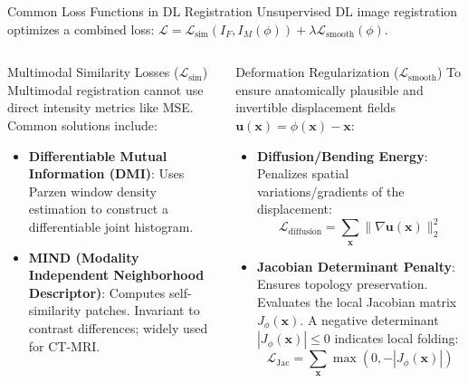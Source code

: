 \documentclass[aspectratio=169,10pt]{beamer}
\begin{document}
\begin{frame}{Common Loss Functions in DL Registration}
\small
Unsupervised DL image registration optimizes a combined loss: $\mathcal{L} = \mathcal{L}_{\text{sim}}(I_F, I_M(\phi)) + \lambda \mathcal{L}_{\text{smooth}}(\phi)$.

\begin{columns}[T,onlytextwidth]
\begin{block}{Multimodal Similarity Losses ($\mathcal{L}_{\text{sim}}$)}
Multimodal registration cannot use direct intensity metrics like MSE. Common solutions include:
\begin{itemize}
    \item \textbf{Differentiable Mutual Information (DMI)}: Uses Parzen window density estimation to construct a differentiable joint histogram.
    \item \textbf{MIND (Modality Independent Neighborhood Descriptor)}: Computes self-similarity patches. Invariant to contrast differences; widely used for CT-MRI.

\end{itemize}
\end{block}

\begin{block}{Deformation Regularization ($\mathcal{L}_{\text{smooth}}$)}
To ensure anatomically plausible and invertible displacement fields $\mathbf{u}(\mathbf{x}) = \phi(\mathbf{x}) - \mathbf{x}$:
\begin{itemize}
    \item \textbf{Diffusion/Bending Energy}: Penalizes spatial variations/gradients of the displacement:
    \[
    \mathcal{L}_{\text{diffusion}} = \sum_{\mathbf{x}} \|\nabla \mathbf{u}(\mathbf{x})\|_2^2
    \]
    \item \textbf{Jacobian Determinant Penalty}: Ensures topology preservation. Evaluates the local Jacobian matrix $J_{\phi}(\mathbf{x})$. A negative determinant $|J_{\phi}(\mathbf{x})| \le 0$ indicates local folding:
    \[
    \mathcal{L}_{\text{Jac}} = \sum_{\mathbf{x}} \max(0, -|J_{\phi}(\mathbf{x})|)
    \]
\end{itemize}
\end{block}
\end{columns}
\end{frame}
\end{document}

